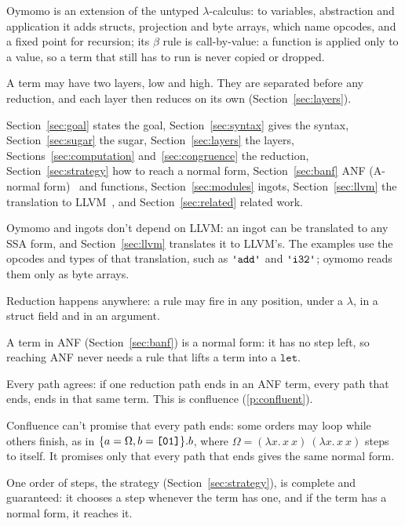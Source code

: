 \documentclass[11pt,letterpaper]{article}
\newcommand{\lam}[2]{\lambda #1.\,#2}       %
\newcommand{\kw}[1]{\mathtt{#1}}
\newcommand{\str}[1]{\text{\ttfamily\textquotesingle #1\textquotesingle}}  %
\newcommand{\hex}[1]{\text{\ttfamily [#1]}}  %
\newcommand{\pref}[1]{\ref{#1}}  %
\begin{document}
\begin{points}
\item Oymomo is an extension of the untyped $\lambda$-calculus: to variables, abstraction and
  application it adds structs, projection and byte arrays, which name
  opcodes, and a fixed point for recursion; its $\beta$ rule is call-by-value: a function is applied only to a value, so a term that still has to run is never copied or dropped.
\item A term may have two layers, low and high. They are separated before any
  reduction, and each layer then reduces on its own (Section~\ref{sec:layers}).
\item Section~\ref{sec:goal} states the goal, Section~\ref{sec:syntax} gives the syntax, Section~\ref{sec:sugar} the sugar,
  Section~\ref{sec:layers} the layers,
  Sections~\ref{sec:computation} and~\ref{sec:congruence} the reduction, Section~\ref{sec:strategy} how to reach a normal form, Section~\ref{sec:banf} ANF (A-normal form)~\cite{flanagan1993} and functions, Section~\ref{sec:modules} ingots, Section~\ref{sec:llvm} the translation to LLVM~\cite{lattner2004}, and Section~\ref{sec:related} related work.
\item Oymomo and ingots don't depend on LLVM: an ingot can be translated to any SSA form, and
  Section~\ref{sec:llvm} translates it to LLVM's. The examples use the opcodes and
  types of that translation, such as $\str{add}$ and $\str{i32}$; oymomo reads them only as byte arrays.
\item\label{p:goal-anywhere} Reduction happens anywhere: a rule may fire in any position, under a
  $\lambda$, in a struct field and in an argument.
\item\label{p:goal-banf} A term in ANF (Section~\ref{sec:banf}) is a normal form: it
  has no step left, so reaching ANF never needs a rule that lifts a term into a $\kw{let}$.
\item\label{p:goal-agree} Every path agrees: if one reduction path ends in an ANF term, every path that ends,
  ends in that same term. This is confluence (\pref{p:confluent}).
\item\label{p:goal-ends} Confluence can't promise that every path ends:  some orders may loop while
  others finish, as in $\{a = \Omega, b = \hex{01}\}.b$, where $\Omega = (\lam{x}{x\ x})\ (\lam{x}{x\ x})$ steps to itself. It promises only that every path that ends gives the same normal form.
\item\label{p:goal-strategy} One order of steps, the strategy (Section~\ref{sec:strategy}), is complete and guaranteed: it
  chooses a step whenever the term has one, and if the term has a normal form, it reaches it.
\end{points}
\end{document}
